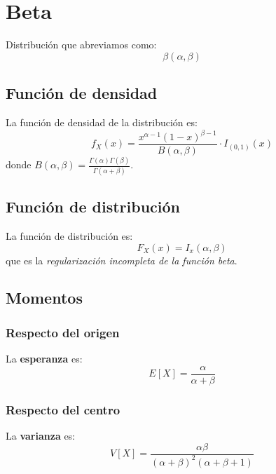\section{Beta}
\label{sec:beta}
Distribución que abreviamos como:
\[
\boxed{\beta\left( \alpha, \beta \right)}
\]

\subsection{Función de densidad}
La función de densidad de la distribución es:
\[
f_X \left( x \right) = \frac{x^{\alpha - 1} \left( 1 - x \right)^{\beta - 1}}{B\left( \alpha, \beta \right)} \cdot I_{\left( 0, 1 \right)} \left( x \right)
\]
donde $B\left( \alpha, \beta \right) = \frac{\Gamma\left( \alpha \right)\Gamma\left( \beta \right)}{\Gamma\left( \alpha + \beta \right)}$.

\subsection{Función de distribución}
La función de distribución es:
\[
F_X\left( x \right) = I_x\left( \alpha, \beta \right)
\]
que es la \textit{regularización incompleta de la función beta}.%

\subsection{Momentos}

\subsubsection*{Respecto del origen}
La \textbf{esperanza} es: 
\[
    E\left[ X \right] = \frac{\alpha}{\alpha + \beta}
\]
\subsubsection*{Respecto del centro}
La \textbf{varianza} es:
\[
    V\left[ X \right] = \frac{\alpha \beta}{\left( \alpha + \beta \right)^2 \left( \alpha + \beta + 1 \right)}
\]

